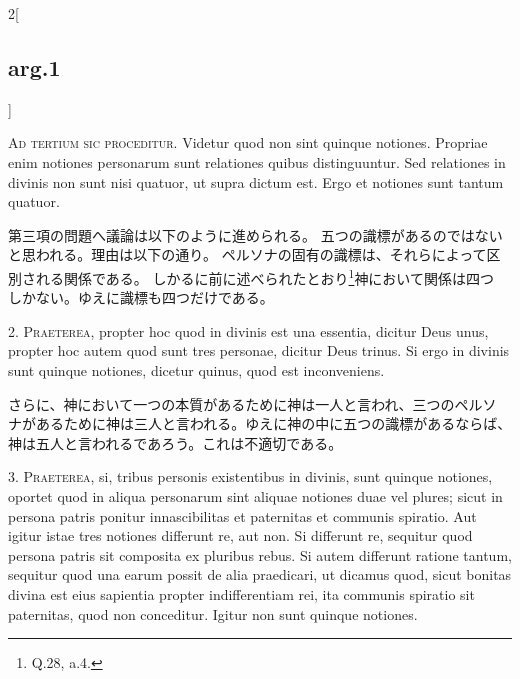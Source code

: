 \documentclass[paper=a4paper,fontsize=10pt,jafontsize=9pt,titlepage]{jlreq}
\begin{document}
\begin{paracol}{2}[\subsection{arg.1}]

{\scshape Ad tertium sic proceditur}. Videtur quod non sint quinque
notiones. Propriae enim notiones personarum sunt relationes quibus
distinguuntur. Sed relationes in divinis non sunt nisi quatuor, ut
supra dictum est. Ergo et notiones sunt tantum quatuor.

\switchcolumn

第三項の問題へ議論は以下のように進められる。
五つの識標があるのではないと思われる。理由は以下の通り。
ペルソナの固有の識標は、それらによって区別される関係である。
しかるに前に述べられたとおり\footnote{Q.28, a.4.}神において関係は四つ
しかない。ゆえに識標も四つだけである。


2. {\scshape Praeterea}, propter hoc quod in divinis est una essentia, dicitur Deus
unus, propter hoc autem quod sunt tres personae, dicitur Deus
trinus. Si ergo in divinis sunt quinque notiones, dicetur quinus, quod
est inconveniens.

\switchcolumn

さらに、神において一つの本質があるために神は一人と言われ、三つのペルソ
ナがあるために神は三人と言われる。ゆえに神の中に五つの識標があるならば、
神は五人と言われるであろう。これは不適切である。


3. {\scshape Praeterea}, si, tribus personis existentibus in divinis, sunt quinque
notiones, oportet quod in aliqua personarum sint aliquae notiones duae
vel plures; sicut in persona patris ponitur innascibilitas et
paternitas et communis spiratio. Aut igitur istae tres notiones
differunt re, aut non. Si differunt re, sequitur quod persona patris
sit composita ex pluribus rebus. Si autem differunt ratione tantum,
sequitur quod una earum possit de alia praedicari, ut dicamus quod,
sicut bonitas divina est eius sapientia propter indifferentiam rei,
ita communis spiratio sit paternitas, quod non conceditur. Igitur non
sunt quinque notiones.


\end{paracol}
\end{document}
